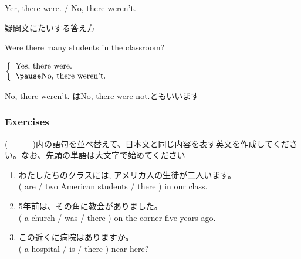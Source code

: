 \documentclass[aspectratio=169,xcolor={dvipsnames,table}]{beamer}
\newcommand{\myaudio}[1]{\href{#1}{\faVolumeUp}}
\begin{document}
 \begin{frame}[plain]{Yer, there were. / No, there weren't.}
 \Large

疑問文にたいする答え方\hfill\myaudio{./audio/001_there_is_12.mp3}
\vspace{10pt}

\pause

Were there many students in the classroom?

\pause

$\left\{\begin{array}{l}
	 \text{Yes, there were.}\\\pause
         \text{No, there weren't.}
	\end{array}\right.$

\pause

\mbox{}\hfill{}{\small No, there weren't. はNo, there were not.ともいいます}
\end{frame}
\begin{frame}[plain]\frametitle{Exercises}
(~~~~~~)内の語句を並べ替えて、日本文と同じ内容を表す英文を作成してください。なお、先頭の単語は大文字で始めてください\pause

  \begin{enumerate}
   \item わたしたちのクラスには,
アメリカ人の生徒が二人います。\\
         ( are / two American students / there ) in our class.\\
         \pause
   \item 5年前は、その角に教会がありました。\\
         ( a church / was / there ) on the corner five years ago.\\
         \pause
   \item この近くに病院はありますか。\\
         ( a hospital / is / there ) near here?\\
  \end{enumerate}
\hfill\myaudio{./audio/001_there_is_13.mp3}
\end{frame}
\end{document}
